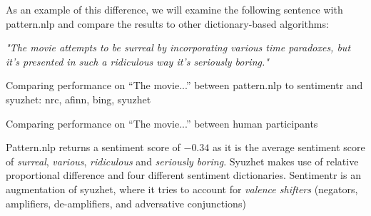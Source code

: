 As an example of this difference, we will examine the following sentence with pattern.nlp and compare the results to other dictionary-based algorithms:

\begin{center}{\textit{"The movie attempts to be surreal by incorporating various time  paradoxes, but it's presented in such a ridiculous way it's seriously boring."}}\end{center}

\begin{table}[H]
\begin{center}
\vspace{1.5mm}
\caption{Comparing performance on \enquote{The movie...} between pattern.nlp to sentimentr and syuzhet: nrc, afinn, bing, syuzhet}
\end{center}
\end{table}
\begin{table}[H]
\begin{center}
\vspace{1.5mm}
\caption{Comparing performance on \enquote{The movie...} between human participants}
\end{center}
\end{table}

Pattern.nlp returns a sentiment score of $-0.34$ as it is the average sentiment score of \textit{surreal}, \textit{various}, \textit{ridiculous} and \textit{seriously boring}. Syuzhet makes use of relative proportional difference and four different sentiment dictionaries. Sentimentr is an augmentation of syuzhet, where it tries to account for \textit{valence shifters} (negators, amplifiers, de-amplifiers, and adversative conjunctions)

